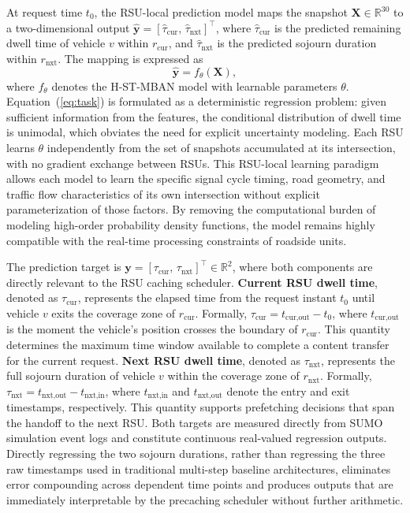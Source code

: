 \documentclass[journal]{IEEEtran}
\begin{document}
At request time $t_0$, the RSU-local prediction model maps the snapshot $\mathbf{X} \in \mathbb{R}^{30}$ to a two-dimensional output $\hat{\mathbf{y}} = [\hat{\tau}_{\text{cur}},\, \hat{\tau}_{\text{nxt}}]^\top$, where $\hat{\tau}_{\text{cur}}$ is the predicted remaining dwell time of vehicle $v$ within $r_{\text{cur}}$, and $\hat{\tau}_{\text{nxt}}$ is the predicted sojourn duration within $r_{\text{nxt}}$. The mapping is expressed as \begin{equation}   \hat{\mathbf{y}} = f_\theta(\mathbf{X}),   \label{eq:task} \end{equation} where $f_\theta$ denotes the H-ST-MBAN model with learnable parameters $\theta$. Equation~(\ref{eq:task}) is formulated as a deterministic regression problem: given sufficient information from the features, the conditional distribution of dwell time is unimodal, which obviates the need for explicit uncertainty modeling. Each RSU learns $\theta$ independently from the set of snapshots accumulated at its intersection, with no gradient exchange between RSUs. This RSU-local learning paradigm allows each model to learn the specific signal cycle timing, road geometry, and traffic flow characteristics of its own intersection without explicit parameterization of those factors. By removing the computational burden of modeling high-order probability density functions, the model remains highly compatible with the real-time processing constraints of roadside units.


The prediction target is $\mathbf{y} = [\tau_{\text{cur}},\, \tau_{\text{nxt}}]^\top \in \mathbb{R}^2$, where both components are directly relevant to the RSU caching scheduler.
\textbf{Current RSU dwell time}, denoted as $\tau_{\text{cur}}$, represents the elapsed time from the request instant $t_0$ until vehicle $v$ exits the coverage zone of $r_{\text{cur}}$.
Formally, $\tau_{\text{cur}} = t_{\text{cur,out}} - t_0$, where $t_{\text{cur,out}}$ is the moment the vehicle's position crosses the boundary of $r_{\text{cur}}$.
This quantity determines the maximum time window available to complete a content transfer for the current request.
\textbf{Next RSU dwell time}, denoted as $\tau_{\text{nxt}}$, represents the full sojourn duration of vehicle $v$ within the coverage zone of $r_{\text{nxt}}$.
Formally, $\tau_{\text{nxt}} = t_{\text{nxt,out}} - t_{\text{nxt,in}}$, where $t_{\text{nxt,in}}$ and $t_{\text{nxt,out}}$ denote the entry and exit timestamps, respectively.
This quantity supports prefetching decisions that span the handoff to the next RSU.
Both targets are measured directly from SUMO simulation event logs and constitute continuous real-valued regression outputs.
Directly regressing the two sojourn durations, rather than regressing the three raw timestamps used in traditional multi-step baseline architectures, eliminates error compounding across dependent time points and produces outputs that are immediately interpretable by the precaching scheduler without further arithmetic.
\end{document}
